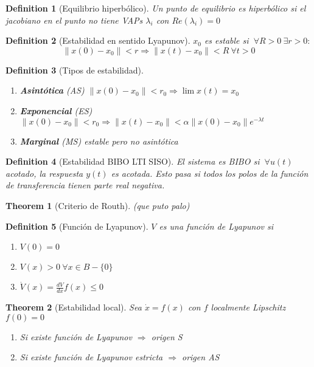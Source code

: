 \documentclass[leqno]{article}
\newtheorem*{theorem}{Theorem}
\newtheorem*{definition}{Definition}
\begin{document}
\begin{definition}[Equilibrio hiperbólico] Un punto de equilibrio es hiperbólico si el jacobiano en el punto no tiene VAPs $\lambda_i$ con $Re(\lambda_i) = 0$
\end{definition}

\begin{definition}[Estabilidad en sentido Lyapunov] $x_0$ es estable si $\ \forall R>0 \ \exists r>0:$
  \[
  \|x(0)-x_0\|<r \Rightarrow \|x(t)-x_0\|<R \ \forall t>0
  \] 
\end{definition}

\begin{definition}[Tipos de estabilidad]\
\begin{enumerate}[topsep=-6pt, itemsep=0pt]
  \item \textbf{Asintótica} (AS) $\|x(0)-x_0\|<r_0 \Rightarrow \lim x(t)=x_0$ 
  \item \textbf{Exponencial} (ES) $\|x(0)-x_0\|<r_0 \Rightarrow \|x(t)-x_0\|<\alpha \|x(0)-x_0\|e^{-\lambda t}$ 
  \item \textbf{Marginal} (MS) estable pero no asintótica
\end{enumerate}
\end{definition}

 \begin{definition}[Estabilidad BIBO LTI SISO] El sistema es BIBO si $\ \forall u(t)$ acotado, la respuesta $y(t)$ es acotada. Esto pasa si todos los polos de la función de transferencia tienen parte real negativa.

\end{definition}

\begin{theorem}[Criterio de Routh] (que puto palo)

\end{theorem}

\begin{definition}[Función de Lyapunov] $V$ es una función de Lyapunov si
  \begin{enumerate}[topsep=-6pt, itemsep=0pt]
    \item $V(0)=0$
	\item  $V(x)>0 \ \forall x\in B-\{0\}$
	\item $\dot{V}(x)=\frac{d V}{d x}f(x) \le 0$
  \end{enumerate}
\end{definition}

\begin{theorem}[Estabilidad local] Sea $\dot{x} = f(x)$ con $f$ localmente Lipschitz  $f(0)=0$
\begin{enumerate}[topsep=-6pt, itemsep=0pt]
  \item Si existe función de Lyapunov $\Rightarrow $ origen S
  \item Si existe función de Lyapunov estricta  $\Rightarrow$ origen AS
\end{enumerate}
\end{theorem}
\end{document}
